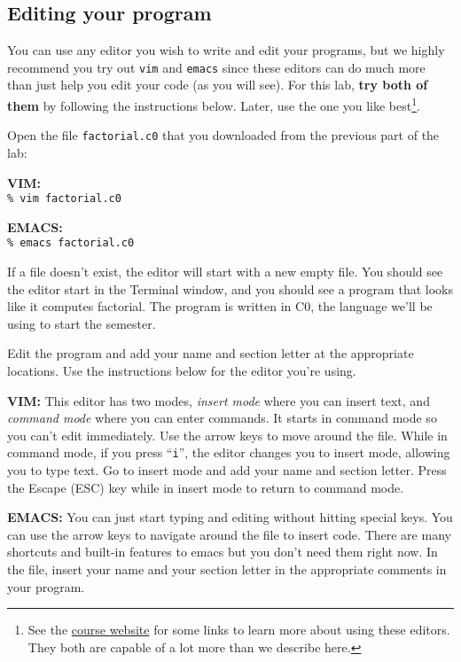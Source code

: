 \subsection*{Editing your program}

You can use any editor you wish to write and edit your programs, but
we highly recommend you try out \lstinline[language={[coin]C}]'vim'
and \lstinline[language={[coin]C}]'emacs' since these editors can do
much more than just help you edit your code (as you will see). For
this lab, \textbf{try both of them} by following the
instructions below.  Later, use the one you like best\footnote{
See the \href{http://www.cs.cmu.edu/~15122/about.shtml}{course website}
for some links to learn more about using these editors. They both
are capable of a lot more than we describe here.}.

\begin{part}
  Open the file \lstinline[language={[coin]C}]'factorial.c0' that you
  downloaded from the previous part of the lab:

  \textbf{VIM:}\\ \lstinline[language={[coin]C}]'%

  \textbf{EMACS:}\\ \lstinline[language={[coin]C}]'%
\end{part}

If a file doesn't exist, the editor will start with a new empty file.
You should see the editor start in the Terminal window, and you should
see a program that looks like it computes factorial. The program is
written in C0, the language we'll be using to start the semester.

\begin{part}
  Edit the program and add your name and section letter at the
  appropriate locations. Use the instructions below for the editor
  you're using.

  \textbf{VIM:} This editor has two modes, \emph{insert mode} where
  you can insert text, and \emph{command mode} where you can enter
  commands.  It starts in command mode so you can't edit
  immediately. Use the arrow keys to move around the file. While in
  command mode, if you press ``\lstinline'i''', the editor changes you
  to insert mode, allowing you to type text. Go to insert mode and
  add your name and section letter.
  Press the Escape (ESC) key while in insert mode to return
  to command mode.

  \textbf{EMACS:} You can just start typing and editing without
  hitting special keys. You can use the arrow keys to navigate around
  the file to insert code. There are many shortcuts and built-in
  features to emacs but you don't need them right now. In the file,
  insert your name and your section letter in the appropriate comments
  in your program.

\end{part}

